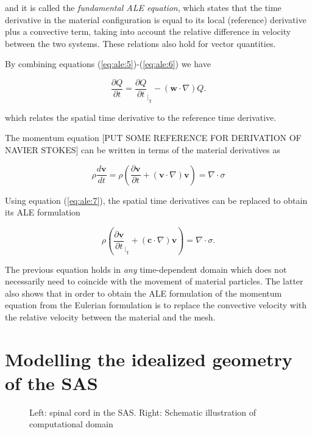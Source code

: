 \documentclass[a4paper,11pt,openright,twoside]{book}
\begin{document}
and it is called the \emph{fundamental ALE equation}, which states that the time derivative in the material configuration is equal to its local (reference) derivative plus a convective term, taking into account the relative difference in velocity between the two systems. These relations also hold for vector quantities.

By combining equations (\ref{eq:ale:5})-(\ref{eq:ale:6}) we have

\begin{equation}
\label{eq:ale:7}
\frac{\partial Q}{\partial t} = \frac{\partial Q}{\partial t}_{|_\chi} - (\mathbf{w} \cdot \nabla) Q.
\end{equation}

which relates the spatial time derivative to the reference time derivative.

The momentum equation [PUT SOME REFERENCE FOR DERIVATION OF NAVIER STOKES] can be written in terms of the material derivatives as

\begin{equation}
\rho \frac{d \mathbf{v}}{d t} = \rho (\frac{\partial \mathbf{v}}{\partial t} + (\mathbf{v} \cdot \nabla)\mathbf{v}) = \nabla \cdot \sigma
\end{equation}

Using equation (\ref{eq:ale:7}), the spatial time derivatives can be replaced to obtain its ALE formulation

\begin{equation}
\rho (\frac{\partial \mathbf{v}}{\partial t}_{|_\chi} + (\mathbf{c} \cdot \nabla)\mathbf{v}) = \nabla \cdot \sigma. 
\end{equation}

The previous equation holds in \emph{any} time-dependent domain which does not necessarily need to coincide with the movement of material particles. The latter also shows that in order to obtain the ALE formulation of the momentum equation from the Eulerian formulation is to replace the convective velocity with the relative velocity between the material and the mesh.

\newpage

\section{Modelling the idealized geometry of the SAS}

\begin{figure}[h!]

  \caption{Left: spinal cord in the SAS. Right: Schematic illustration
    of computational domain}
\end{figure}
\end{document}
